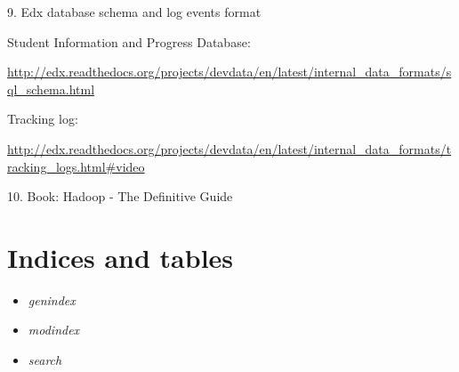 \documentclass[a4paper,12pt,oneside]{sphinxmanual}
\begin{document}
\begin{DUlineblock}{0em}
\item[] 9. Edx database schema and log events format
\item[]
\begin{DUlineblock}{\DUlineblockindent}
\item[] Student Information and Progress Database:
\item[] \href{http://edx.readthedocs.org/projects/devdata/en/latest/internal\_data\_formats/sql\_schema.html}{http://edx.readthedocs.org/projects/devdata/en/latest/internal\_data\_formats/sql\_schema.html}
\item[] Tracking log:
\item[] \href{http://edx.readthedocs.org/projects/devdata/en/latest/internal\_data\_formats/tracking\_logs.html\#video}{http://edx.readthedocs.org/projects/devdata/en/latest/internal\_data\_formats/tracking\_logs.html\#video}
\end{DUlineblock}
\end{DUlineblock}

\begin{DUlineblock}{0em}
\item[] 10. Book: Hadoop - The Definitive Guide
\end{DUlineblock}


\chapter{Indices and tables}
\label{index:indices-and-tables}\begin{itemize}
\item {} 
\emph{genindex}

\item {} 
\emph{modindex}

\item {} 
\emph{search}

\end{itemize}



\renewcommand{\indexname}{Index}
\printindex
\end{document}
